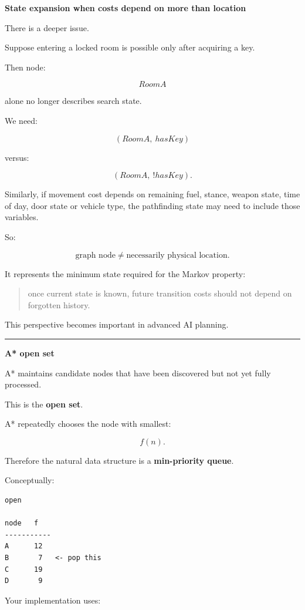 \textbf{State expansion when costs depend on more than location}

There is a deeper issue.

Suppose entering a locked room is possible only after acquiring a key.

Then node:

\[
RoomA
\]

alone no longer describes search state.

We need:

\[
(RoomA,\ hasKey)
\]

versus:

\[
(RoomA,\ !hasKey).
\]

Similarly, if movement cost depends on remaining fuel, stance, weapon state, time of day, door state or vehicle type, the pathfinding state may need to include those variables.

So:

\[
\boxed{
\text{graph node}
\neq
\text{necessarily physical location}.
}
\]

It represents the minimum state required for the Markov property:

\begin{quote}
once current state is known, future transition costs should not depend on forgotten history.
\end{quote}

This perspective becomes important in advanced AI planning.

\begin{center}\rule{0.5\linewidth}{0.5pt}\end{center}

\textbf{A* open set}

A* maintains candidate nodes that have been discovered but not yet fully processed.

This is the \textbf{open set}.

A* repeatedly chooses the node with smallest:

\[
f(n).
\]

Therefore the natural data structure is a \textbf{min-priority queue}.

Conceptually:

\begin{verbatim}
open

node   f
-----------
A      12
B       7   <- pop this
C      19
D       9
\end{verbatim}

Your implementation uses:


